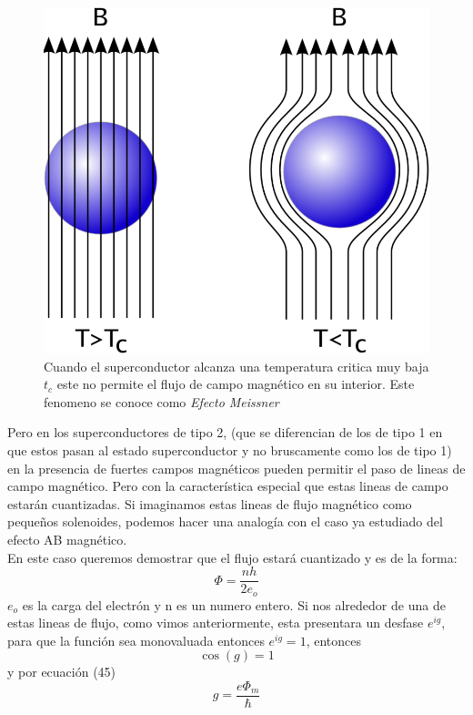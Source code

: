 \documentclass[12pt]{article}
\begin{document}
\begin{figure}[H]
\centering
\includegraphics[scale=.3]{img/meisser.png}
\caption{Cuando el superconductor alcanza una temperatura critica muy baja $t_c$ este no permite el flujo de campo magnético en su interior. Este fenomeno se conoce como \textit{Efecto Meissner} }
\end{figure}

Pero en los superconductores de tipo 2, (que se diferencian de los de tipo 1 en que estos pasan al estado superconductor y no bruscamente como los de tipo 1) en la presencia de fuertes campos magnéticos pueden permitir el paso de lineas de campo magnético. Pero con la característica especial que estas lineas de campo estarán cuantizadas. Si imaginamos estas lineas de flujo magnético como pequeños solenoides, podemos hacer una analogía con el caso ya estudiado del efecto AB magnético.\\
En este caso queremos demostrar que el flujo estará cuantizado y es de la forma:
\begin{equation}
\Phi=\frac{nh}{2e_o}
\end{equation}
$e_o$ es la carga del electrón y n es un numero entero.
Si nos alrededor de una de estas lineas de flujo, como vimos anteriormente, esta presentara un desfase $e^{ig}$, para que la función sea monovaluada entonces $e^{ig}=1$, entonces
\begin{equation}
\cos(g)=1
\end{equation}
y por ecuación (45)
\begin{equation}
g=\frac{e\Phi_m}{\hbar}
\end{equation}
\end{document}
